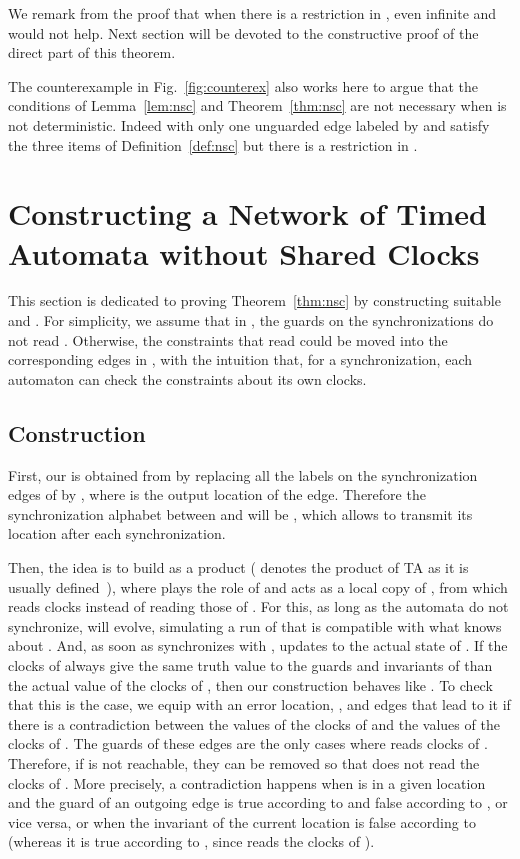 \documentclass{LMCS}
\theoremstyle{plain}\newtheorem*{prop11}{Proposition~\ref{prop:states} bis}
\begin{document}
We remark from the proof that when there is a restriction in ,
even infinite  and  would not help. Next section will be devoted to the constructive proof of the direct part of
this theorem.

The counterexample in Fig.~\ref{fig:counterex} also works here to argue that the
conditions of Lemma~\ref{lem:nsc} and Theorem~\ref{thm:nsc} are not necessary
when  is not deterministic. Indeed  with only one unguarded edge
labeled by  and  satisfy the three items of
Definition~\ref{def:nsc} but there is a restriction in .





\section{Constructing a Network of Timed Automata without Shared Clocks}\label{sec:construction}
This section is dedicated to proving Theorem~\ref{thm:nsc} by constructing
suitable  and .
For simplicity, we assume that in , the guards on the synchronizations do
not read . Otherwise, the constraints that read  could be moved
into the corresponding edges in , with the intuition that, for a
synchronization, each automaton can check the constraints about its own clocks.


\subsection{Construction}\label{subsec:simple}
First, our  is obtained from  by replacing all the labels
 on the synchronization edges of  by
, where  is the output location of the
edge. Therefore the synchronization alphabet between  and  will
be , which allows  to transmit its location
after each synchronization.


Then, the idea is to build  as a product 
( denotes the product of TA as it is usually defined~\cite{AD94}),
where  plays the role of  and  acts as a
local copy of , from which  reads clocks instead of
reading those of .
For this, as long as the automata do not synchronize,  will evolve,
simulating a run of  that is compatible with what  knows about
.
And, as soon as  synchronizes with ,  updates
 to the actual state of .
If the clocks of  always give the same truth value to the guards and
invariants of  than the actual value of the clocks of , then our
construction behaves like . To check that this is the case,
we equip  with an error location, , and edges that lead to it if there is a
contradiction between the values of the clocks of  and the values of the
clocks of . The guards of these edges are the only cases where
 reads clocks of . Therefore, if  is not
reachable, they can be removed so that  does not read the clocks of
.
More precisely, a contradiction happens when  is in a given
location and the guard of an outgoing edge is true according to  and
false according to , or vice versa, or when the invariant of the current
location is false according to  (whereas it is true according to
, since  reads the clocks of ).
\end{document}
